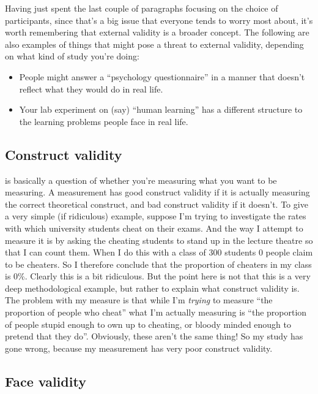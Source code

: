 Having just spent the last couple of paragraphs focusing on the choice of participants, since that's a big issue that everyone tends to worry most about, it's worth remembering that external validity is a broader concept. The following are also examples of things that might pose a threat to external validity, depending on what kind of study you're doing:
\begin{itemize}
\item People might answer a ``psychology questionnaire'' in a manner that doesn't reflect what they would do in real life.
\item Your lab experiment on (say) ``human learning'' has a different structure to the learning problems people face in real life.
\end{itemize}


\subsection{Construct validity}

 is basically a question of whether you're measuring what you want to be measuring.  A measurement has good construct validity if it is actually measuring the correct theoretical construct, and bad construct validity if it doesn't.  To give a very simple (if ridiculous) example, suppose I'm trying to investigate the rates with which university students cheat on their exams. And the way I attempt to measure it is by asking the cheating students to stand up in the lecture theatre so that I can count them. When I do this with a class of 300 students 0 people claim to be cheaters. So I therefore conclude that the proportion of cheaters in my class is 0\%. Clearly this is a bit ridiculous. But the point here is not that this is a very deep methodological example, but rather to explain what construct validity is. The problem with my measure is that while I'm {\it trying} to measure ``the proportion of people who cheat'' what I'm actually measuring is ``the proportion of people stupid enough to own up to cheating, or bloody minded enough to pretend that they do''. Obviously, these aren't the same thing! So my study has gone wrong, because my measurement has very poor construct validity.

\subsection{Face validity}

